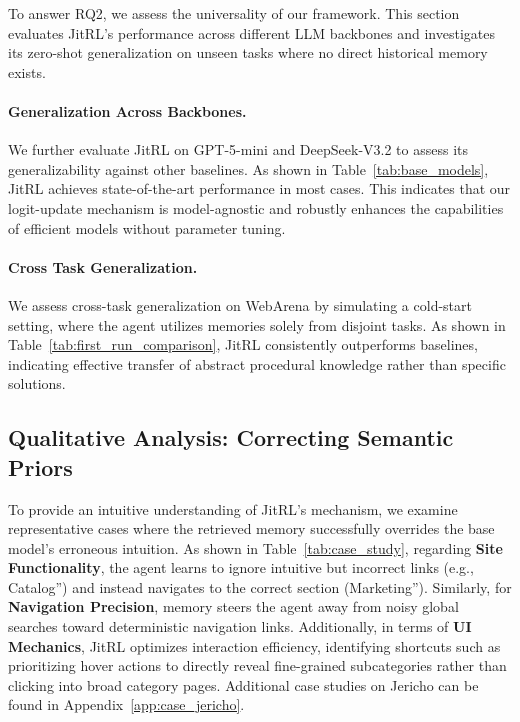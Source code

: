 



To answer RQ2, we assess the universality of our framework. This section evaluates JitRL's performance across different LLM backbones and investigates its zero-shot generalization on unseen tasks where no direct historical memory exists.

\paragraph{Generalization Across Backbones.}
We further evaluate JitRL on GPT-5-mini and DeepSeek-V3.2 \citep{deepseek} to assess its generalizability against other baselines. As shown in Table~\ref{tab:base_models}, JitRL achieves state-of-the-art performance in most cases. This indicates that our logit-update mechanism is model-agnostic and robustly enhances the capabilities of efficient models without parameter tuning.

\paragraph{Cross Task Generalization.}
We assess cross-task generalization on WebArena by simulating a cold-start setting, where the agent utilizes memories solely from disjoint tasks.
As shown in Table~\ref{tab:first_run_comparison}, JitRL consistently outperforms baselines, indicating effective transfer of abstract procedural knowledge rather than specific solutions.



\subsection{Qualitative Analysis: Correcting Semantic Priors}

\label{sec:case_study}

To provide an intuitive understanding of JitRL's mechanism, we examine representative cases where the retrieved memory successfully overrides the base model's erroneous intuition. As shown in Table~\ref{tab:case_study}, regarding \textbf{Site Functionality}, the agent learns to ignore intuitive but incorrect links (e.g., Catalog'') and instead navigates to the correct section (Marketing''). Similarly, for \textbf{Navigation Precision}, memory steers the agent away from noisy global searches toward deterministic navigation links. Additionally, in terms of \textbf{UI Mechanics}, JitRL optimizes interaction efficiency, identifying shortcuts such as prioritizing hover actions to directly reveal fine-grained subcategories rather than clicking into broad category pages.
Additional case studies on Jericho can be found in Appendix~\ref{app:case_jericho}.


